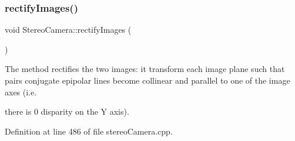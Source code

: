 \begin{DoxyCode}{0}
\end{DoxyCode}
\mbox{\label{classStereoCamera_ae5ac866c6d4b6c4819b01a918e7b61e0}} 
\subsubsection{\texorpdfstring{rectifyImages()}{rectifyImages()}}
{\footnotesize\ttfamily void Stereo\+Camera\+::rectify\+Images (\begin{DoxyParamCaption}{ }\end{DoxyParamCaption})}



The method rectifies the two images\+: it transform each image plane such that pairs conjugate epipolar lines become collinear and parallel to one of the image axes (i.\+e. 

there is 0 disparity on the Y axis). 

Definition at line 486 of file stereo\+Camera.\+cpp.


